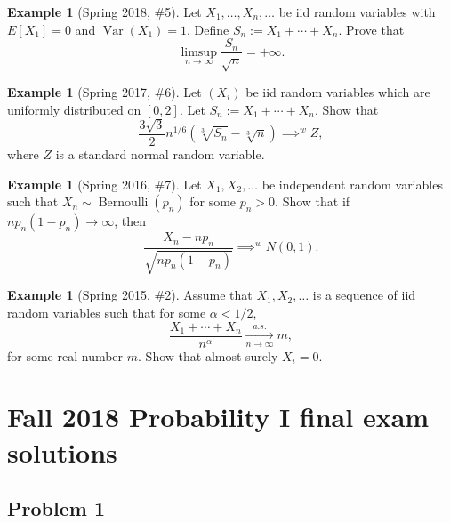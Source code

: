 \documentclass[12pt,reqno]{article}
\theoremstyle{plain}
\theoremstyle{definition}
\newtheorem{example}[theorem]{Example}
\begin{document}
\begin{example}[Spring 2018, \#5]
Let $X_1,\ldots,X_n,\ldots$ be iid random variables with $E[X_1] = 0$ and 
$\operatorname{Var}(X_1) = 1$. Define $S_n := X_1+\cdots+X_n$. 
Prove that 
\[
\limsup_{n \rightarrow \infty} \frac{S_n}{\sqrt{n}} = +\infty. 
\]
\end{example} 

\begin{example}[Spring 2017, \#6]
Let $(X_i)$ be iid random variables which are uniformly distributed on 
$[0,2]$. Let $S_n := X_1+\cdots+X_n$. Show that 
\[
\frac{3\sqrt{3}}{2} n^{1/6}\left(\sqrt[3]{S_n} - \sqrt[3]{n}\right) 
     \implies^{w} Z, 
\]
where $Z$ is a standard normal random variable.  
\end{example} 

\begin{example}[Spring 2016, \#7]
Let $X_1,X_2,\ldots$ be independent random variables such that 
$X_n \sim \operatorname{Bernoulli}(p_n)$ for some $p_n > 0$. Show that if 
$np_n(1-p_n) \rightarrow \infty$, then 
\[
\frac{X_n - np_n}{\sqrt{np_n(1-p_n)}} \implies^{w} N(0, 1). 
\]
\end{example} 

\begin{example}[Spring 2015, \#2]
Assume that $X_1,X_2,\ldots$ is a sequence of iid random variables such 
that for some $\alpha < 1/2$,
\[
\frac{X_1+\cdots+X_n}{n^{\alpha}} \xrightarrow[n \rightarrow \infty]{a.s.} m, 
\]
for some real number $m$. Show that almost surely $X_i = 0$. 
\end{example} 


\newpage
\section{Fall 2018 Probability I final exam solutions} 

\subsection{Problem 1}
\end{document}
